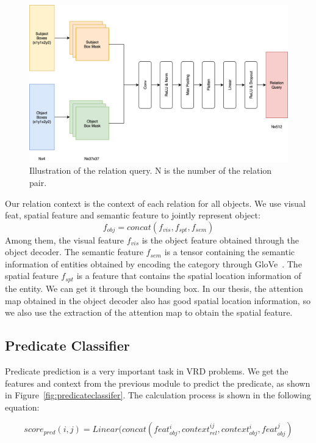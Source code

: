 \begin{figure}[tbph!]
	\centering
	\includegraphics[width=1\linewidth]{figures/relation_query}
	\caption[Illustration of the relation query]{Illustration of the relation query. N is the number of the relation pair.}
	\label{fig:relationquery}
\end{figure}

Our relation context is the context of each relation for all objects. We use visual feat, spatial feature and  semantic feature to jointly represent object: $$f_{obj} = concat(f_{vis},f_{spt},f_{sem})$$ Among them, the visual feature $f_{vis}$ is the object feature obtained through the object decoder. The semantic feature $ f_{sem} $ is a tensor containing the semantic information of entities obtained by encoding the category through GloVe~\cite{pennington2014glove}. The spatial feature $ f_{spt} $ is a feature that contains the spatial location information of the entity. We can get it through the bounding box. In our thesis, the attention map obtained in the object decoder also has good spatial location information, so we also use the extraction of the attention map to obtain the spatial feature.



\subsection{Predicate Classifier}
Predicate prediction is a very important task in VRD problems. We get the features and context from the previous module to predict the predicate, as shown in Figure~\ref{fig:predicateclassifer}. The calculation process is shown in the following equation:

$$ score_{pred}(i,j) = Linear(concat(feat_{obj}^i, context_{rel}^{ij}, context_{obj}^i, feat_{obj}^j) $$

